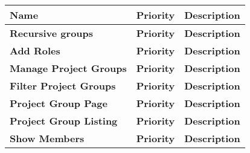 \begin{figure}%
\begin{tabular}{|p{}|p{}|p{}|}
	\hline
	\textbf{Name} & \textbf{Priority} & \textbf{Description} \\
	\hline
	\textbf{Recursive groups} & \textbf{Priority} & \textbf{Description} \\
	\hline
	\textbf{Add Roles} & \textbf{Priority} & \textbf{Description} \\
	\hline
	\textbf{Manage Project Groups } & \textbf{Priority} & \textbf{Description} \\
	\hline
	\textbf{Filter Project Groups} & \textbf{Priority} & \textbf{Description} \\
	\hline
	\textbf{Project Group Page} & \textbf{Priority} & \textbf{Description} \\
	\hline
	\textbf{Project Group Listing} & \textbf{Priority} & \textbf{Description} \\
	\hline
	\textbf{Show Members} & \textbf{Priority} & \textbf{Description} \\
	\hline


	
	
	
\end{tabular}
\label{fig:productbacklog}
\end{figure}


